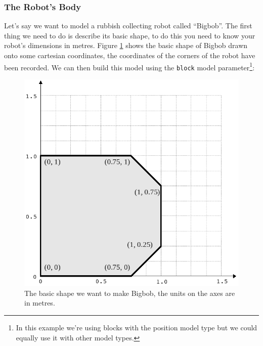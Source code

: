 \documentclass[a4paper]{report}
\begin{document}
\subsubsection{The Robot's Body}
Let's say we want to model a rubbish collecting robot called ``Bigbob''. The first thing we need to do is describe its basic shape, to do this you need to know your robot's dimensions in metres. Figure \ref{fig:basicbigbob} shows the basic shape of Bigbob drawn onto some cartesian coordinates, the coordinates of the corners of the robot have been recorded. We can then build this model using the \verb|block| model parameter\footnote{In this example we're using blocks with the position model type but we could equally use it with other model types.}:
\begin{figure}
	\centering
	\includegraphics[width=0.7\linewidth]{./pics/robot_building/bigbob1.png} 
	\caption{The basic shape we want to make Bigbob, the units on the axes are in metres.}
	\label{fig:basicbigbob}
\end{figure}
\end{document}
